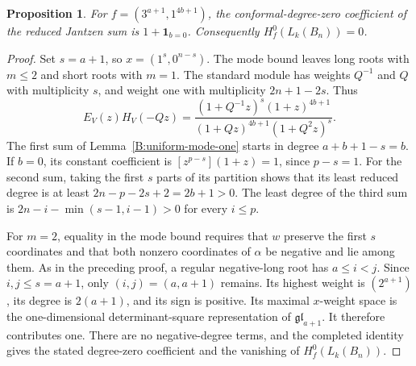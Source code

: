 \documentclass[11pt,a4paper]{amsart}
\numberwithin{equation}{section}
\newtheorem{proposition}[theorem]{Proposition}
\theoremstyle{definition}
\theoremstyle{remark}
\begin{document}
\begin{proposition}\label{B:uniform-triple-hook}
For $f=(3^{a+1},1^{4b+1})$, the conformal-degree-zero coefficient
of the reduced Jantzen sum is $1+\mathbf1_{b=0}$. Consequently
$H_f^0(L_k(B_n))=0$.
\end{proposition}
\begin{proof}
Set $s=a+1$, so $x=(1^s,0^{n-s})$.
The mode bound leaves long roots with $m\leq2$ and short roots
with $m=1$. The standard module has weights
$Q^{-1}$ and $Q$ with multiplicity $s$, and weight one with
multiplicity $2n+1-2s$. Thus
$$
 E_V(z)H_V(-Qz)
 =\frac{(1+Q^{-1}z)^s(1+z)^{4b+1}}
 {(1+Qz)^{4b+1}(1+Q^2z)^s}.
$$
The first sum of Lemma~\ref{B:uniform-mode-one} starts in degree
$a+b+1-s=b$. If $b=0$, its constant coefficient is
$[z^{p-s}](1+z)=1$, since $p-s=1$.
For the second sum, taking the first $s$ parts of its partition
shows that its least reduced degree is at least
$2n-p-2s+2=2b+1>0$. The least degree of the third sum is
$2n-i-\min(s-1,i-1)>0$ for every $i\leq p$.

For $m=2$, equality in the mode bound requires that $w$ preserve
the first $s$ coordinates and that both nonzero coordinates of
$\alpha$ be negative and lie among them. As in the preceding
proof, a regular negative-long root has $a\leq i<j$.
Since $i,j\leq s=a+1$, only $(i,j)=(a,a+1)$ remains.
Its highest weight is $(2^{a+1})$, its degree is $2(a+1)$, and
its sign is positive. Its maximal $x$-weight space is the
one-dimensional determinant-square representation of
$\mathfrak{gl}_{a+1}$. It therefore contributes one.
There are no negative-degree terms, and the completed identity
gives the stated degree-zero coefficient and the vanishing of
$H_f^0(L_k(B_n))$.
\end{proof}
\end{document}

